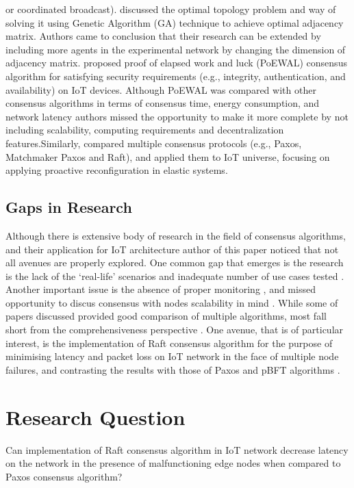 \documentclass[	DIV=calc,%
							paper=a4,%
							fontsize=11pt,%
							twocolumn]{scrartcl}	 				%
\begin{document}
or coordinated broadcast).\smallskip \newline  {} discussed the optimal topology problem and way of solving it using Genetic Algorithm (GA) technique to achieve optimal adjacency matrix. Authors came to conclusion that their research can be extended by including more agents in the experimental network by changing the dimension of adjacency matrix.\smallskip \newline {} proposed proof of elapsed work and luck (PoEWAL) consensus algorithm for satisfying security requirements (e.g., integrity, authentication, and availability) on IoT devices. Although PoEWAL was compared with other consensus algorithms in terms of consensus time, energy consumption, and network latency authors missed the opportunity to make it more complete by not including scalability, computing requirements and decentralization features.\smallskip \newline Similarly,  compared multiple consensus protocols (e.g., Paxos, Matchmaker Paxos  and Raft), and applied them to IoT universe, focusing on applying proactive reconfiguration in elastic systems.
\subsection{Gaps in Research}
Although there is extensive body of research in the field of consensus algorithms, and their application for IoT architecture author of this paper noticed that not all avenues are properly explored. One common gap that emerges is the research is the lack of the ‘real-life’ scenarios \cite{GULATI2020102222,10.1145/3132211.3134454} and inadequate number of use cases tested \cite{10.1007/978-3-030-30278-8_34, 8737532,FORTINO202034,MONDAL202041}. Another important issue is the absence of proper monitoring \cite{Hao2018EdgeConsAE} , and missed opportunity to discus consensus with nodes scalability in mind \cite{6740862, ROCHA20191,RAGHAV2020101291}. While some of papers discussed provided good comparison of multiple algorithms, most fall short from the comprehensiveness perspective \cite{OROSTICA201915, SALIMITARI2020100212,7417252}. One avenue, that is of particular interest, is the implementation of Raft consensus algorithm for the purpose of minimising latency and packet loss on IoT network in the face of multiple node failures, and contrasting the results with those of Paxos and pBFT algorithms \cite{whittaker2020matchmaker,GRAMOLI2020760}.
\section{Research Question}
Can implementation of Raft consensus algorithm in IoT network decrease latency on the network in the presence of malfunctioning edge nodes when compared to Paxos consensus algorithm?
\end{document}
